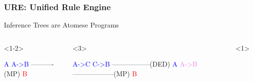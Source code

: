 \documentclass{beamer}
\begin{document}
\begin{frame}[fragile]
  \frametitle{URE: Unified Rule Engine}
  Inference Trees are \alert{Atomese} Programs

  \begin{columns}
    \column{0.1in}

    \begin{onlyenv}<1-2>
    
{\tiny \begin{semiverbatim}
\textcolor{blue}{A  A->B}
----------(MP)      
   \textcolor{red}{B}
\end{semiverbatim}}

\end{onlyenv}

\begin{onlyenv}<3>

{\tiny \begin{semiverbatim}
     \textcolor{blue}{A->C   C->B}
     -----------------(DED)
\textcolor{blue}{A}       \textcolor{violet}{A->B}
------------------(MP)
     \textcolor{red}{B}
\end{semiverbatim}}

\end{onlyenv}

\column{2in}

\begin{onlyenv}<1>


\end{onlyenv}
\end{columns}
\end{frame}
\end{document}
